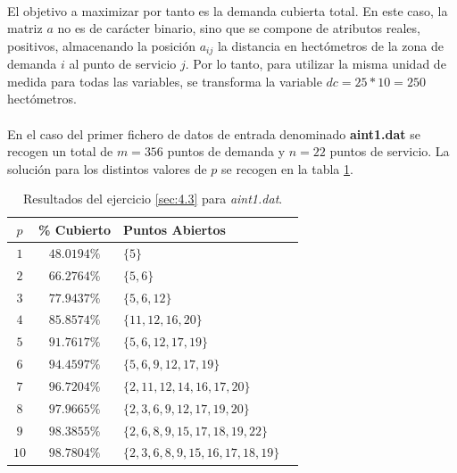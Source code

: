 \documentclass[spanish]{article}
\begin{document}
			\paragraph{}
			El objetivo a maximizar por tanto es la demanda cubierta total. En este caso, la matriz $a$ no es de carácter binario, sino que se compone de atributos reales, positivos, almacenando la posición $a_{ij}$ la distancia en hectómetros de la zona de demanda $i$ al punto de servicio $j$. Por lo tanto, para utilizar la misma unidad de medida para todas las variables, se transforma la variable $dc = 25 * 10 = 250$ hectómetros.

			\paragraph{}
			En el caso del primer fichero de datos de entrada denominado \textbf{aint1.dat} se recogen un total de $m = 356$ puntos de demanda y $n=22$ puntos de servicio. La solución para los distintos valores de $p$ se recogen en la tabla \ref{table:sol-4.3a}.

			\begin{table}[h]
				\begin{center}
					\begin{tabular}{|c || c || l || c | }
						\hline
						$p$		&	\% Cubierto	& Puntos Abiertos 						 	\\ \hline \hline
						$1$ 	& $48.0194\%$ & $\{5\}$ 											\\ \hline
						$2$ 	& $66.2764\%$ & $\{5,6\}$ 										\\ \hline
						$3$ 	& $77.9437\%$ & $\{5,6,12\}$ 									\\ \hline
						$4$ 	& $85.8574\%$ & $\{11,12,16,20\}$ 						\\ \hline
						$5$ 	& $91.7617\%$ & $\{5,6,12,17,19\}$ 						\\ \hline
						$6$ 	& $94.4597\%$ & $\{5,6,9,12,17,19\}$ 					\\ \hline
						$7$ 	& $96.7204\%$ & $\{2,11,12,14,16,17,20\}$ 		\\ \hline
						$8$ 	& $97.9665\%$ & $\{2,3,6,9,12,17,19,20\}$ 		\\ \hline
						$9$ 	& $98.3855\%$ & $\{2,6,8,9,15,17,18,19,22\}$	\\ \hline
						$10$ 	& $98.7804\%$ & $\{2,3,6,8,9,15,16,17,18,19\}$\\
						\hline
					\end{tabular}
				\end{center}
				\caption{Resultados del ejercicio \ref{sec:4.3} para \emph{aint1.dat}.}
				\label{table:sol-4.3a}
			\end{table}
\end{document}
